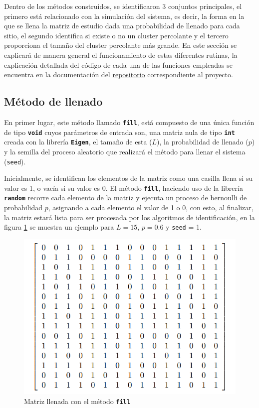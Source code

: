 \documentclass[11pt,twocolumn]{article}
\begin{document}
Dentro de los métodos construidos, se identificaron 3 conjuntos principales, el primero está relacionado con la simulación del sistema, es decir, la forma en la que se llena la matriz de estudio dada una probabilidad de llenado para cada sitio, el segundo identifica si existe o no un cluster percolante y el tercero proporciona el tamaño del cluster percolante más grande. En este sección se explicará de manera general el funcionamiento de estas diferentes rutinas, la explicación detallada del código de cada una de las funciones empleadas se encuentra en la documentación del \href{https://github.com/HerrComp/2022-i-herrcomp-proyectointermedio-nmfj-2dpercolation}{repositorio} correspondiente al proyecto.

\subsection{\textbf{Método de llenado}}
En primer lugar, este método llamado \texttt{\textbf{fill}}, está compuesto de una única función de tipo \texttt{\textbf{void}} cuyos parámetros de entrada son, una matriz nula de tipo \texttt{\textbf{int}} creada con la librería \texttt{\textbf{Eigen}}, el tamaño de esta ($L$), la probabilidad de llenado ($p$) y la semilla del proceso aleatorio que realizará el método para llenar el sistema (\texttt{{seed}}).
\vspace{0.2 cm}

Inicialmente, se identifican los elementos de la matriz como una casilla llena si su valor es 1, o vacía si su valor es 0. El método \texttt{\textbf{fill}}, haciendo uso de la librería \texttt{\textbf{random}} recorre cada elemento de la matriz y ejecuta un proceso de bernoulli de probabilidad $p$, asignando a cada elemento el valor de 1 o 0, con esto, al finalizar, la matriz estará lista para ser procesada por los algoritmos de identificación, en la figura \ref{fill} se muestra un ejemplo para $L=15$, $p = 0.6$ y \texttt{seed} = 1.

\begin{figure}[H]
    \centering
    \includegraphics[scale=0.47]{Imagenes/matriz1.png}
    \caption{Matriz llenada con el método \textbf{\texttt{\textbf{fill}}}}
    \label{fill}
\end{figure}
\end{document}
